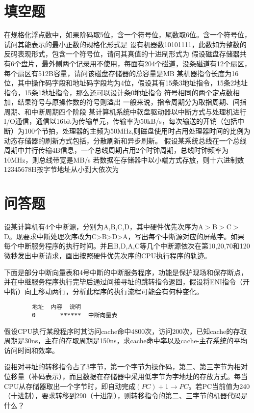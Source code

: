 \documentclass[a4paper]{exam}
\newif\ifprint
\newcommand{\blank}[2][1cm]{\uline{\makebox[#1][c]{%
			\ifprint
			\phantom{#2}%
			\else
			#2%
			\fi}}}
\begin{document}
\section{填空题}
\begin{questions}
	\question 在规格化浮点数中，如果阶码取5位，含一个符号位，尾数取6位。含一个符号位，试问其能表示的最小正数的规格化形式是\blank{}
	\question 设有机器数10101111，此数如为整数的反码表现形式，包含一个符号位，请问其真值的十进制形式为\blank{}
	\question 假设磁盘存储器共有6个盘片，最外侧两个记录用不使用，每面有204个磁道，没条磁道有12个扇区，每个扇区有512B容量，请问该磁盘存储器的总容量是\blank{}MB
	\question 某机器指令长度为16位，其中操作码字段和地址码字段均为4位，假设其有15条3地址指令，15条2地址指令，15条1地址指令，那么还可以设计\blank{}条0地址指令
	\question 符号相同的两个定点数相加，结果符号与原操作数的符号\blank{}则溢出
	\question 一般来说，指令周期分为取指周期、间指周期、\blank{}和中断周期四个阶段
	\question 某计算机系统中软盘驱动器以中断方式与处理机进行I/O通信，通信以16bit为传输单元，传输率为50kB/s，每次输送的开销（包括中断）为100个节拍，处理器的主频为50MHz,则磁盘使用时占用处理器时间的比例为\blank{}
	\question 动态存储器的刷新方式包括\blank{}，分散刷新和异步刷新。
	\question 假设某系统总线在一个总线周期中并行传输4B信息，一个总线周期占用2个时钟周期，总线时钟频率为10MHz，则总线带宽是\blank{}MB/s
	\question 若数据在存储器中以小端方式存放，则十六进制数12345678H按字节地址从小到大依次为\blank{}
\end{questions}

\section{问答题}
\begin{questions}
	\question 设某计算机有4个中断源，分别为A,B,C,D，其中硬件优先次序为A$>$B$>$C$>$D。现要求中断处理次序改为C>B>D>A，写出每个中断源对应的屏蔽字。如果每个中断服务程序的执行时间。并且B,D,A,C等几个中断源依次在第10,20,70和120微秒发出中断请求，画出按照硬件优先次序的CPU执行程序的轨迹。

	\vspace{2cm}
	\question 下面是部分中断向量表和4号中断的中断服务程序，功能是保护现场和保存断点，并在中继服务程序执行完毕后通过间接寻址的跳转指令返回，假设将ENI指令（开中断）向上移动两行，分析此程序的执行流程可能会有何种变化。

	\begin{verbatim}
		地址	内容	说明
		0       ******  中断向量表
	\end{verbatim}

	\vspace{3cm}

	\question 假设CPU执行某段程序时其访问cache命中4800次，访问200次，已知cache的存取周期是30ns，主存的存取周期是150ns，求cache命中率以及cache-主存系统的平均访问时间和效率。

	\vspace{3cm}

	\question 设相对寻址的转移指令占了3字节，第一个字节为操作码，第二、第三字节为相对位移量（补码表示），而且数据在存储器中采用低字节为字地址的存放方式。每当CPU从存储器取出一个字节时，即自动完成$\left( {PC} \right) + 1 \to PC$。若PC当前值为240（十进制），要求转移到290（十进制），则转移指令的第二、三字节的机器代码是什么？
\end{questions}
\end{document}
